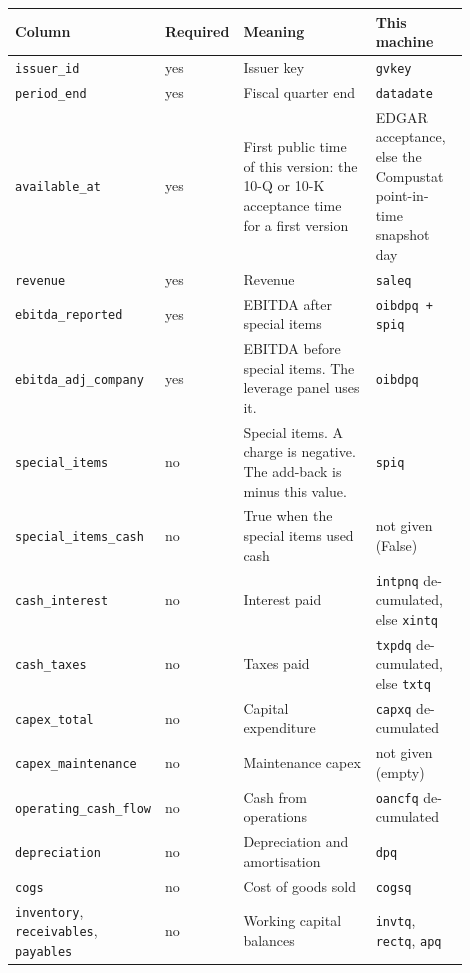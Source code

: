 \documentclass[10.5pt,a4paper]{article}
\newcommand{\code}[1]{\texttt{\small #1}}
\begin{document}
\begin{longtable}{@{}>{\raggedright\arraybackslash}p{0.180\linewidth}>{\raggedright\arraybackslash}p{0.135\linewidth}>{\raggedright\arraybackslash}p{0.360\linewidth}>{\raggedright\arraybackslash}p{0.225\linewidth}@{}}
\toprule
\textbf{Column} & \textbf{Required} & \textbf{Meaning} & \textbf{This machine}\\
\midrule
\endhead
\code{issuer\_\allowbreak{}id} & yes & Issuer key & \code{gvkey}\\
\code{period\_\allowbreak{}end} & yes & Fiscal quarter end & \code{datadate}\\
\code{available\_\allowbreak{}at} & yes & First public time of this version: the 10-Q or 10-K acceptance time for a first version & EDGAR acceptance, else the Compustat point-in-time snapshot day\\
\code{revenue} & yes & Revenue & \code{saleq}\\
\code{ebitda\_\allowbreak{}reported} & yes & EBITDA after special items & \code{oibdpq + spiq}\\
\code{ebitda\_\allowbreak{}adj\_\allowbreak{}company} & yes & EBITDA before special items. The leverage panel uses it. & \code{oibdpq}\\
\code{special\_\allowbreak{}items} & no & Special items. A charge is negative. The add-back is minus this value. & \code{spiq}\\
\code{special\_\allowbreak{}items\_\allowbreak{}cash} & no & True when the special items used cash & not given (False)\\
\code{cash\_\allowbreak{}interest} & no & Interest paid & \code{intpnq} de-cumulated, else \code{xintq}\\
\code{cash\_\allowbreak{}taxes} & no & Taxes paid & \code{txpdq} de-cumulated, else \code{txtq}\\
\code{capex\_\allowbreak{}total} & no & Capital expenditure & \code{capxq} de-cumulated\\
\code{capex\_\allowbreak{}maintenance} & no & Maintenance capex & not given (empty)\\
\code{operating\_\allowbreak{}cash\_\allowbreak{}flow} & no & Cash from operations & \code{oancfq} de-cumulated\\
\code{depreciation} & no & Depreciation and amortisation & \code{dpq}\\
\code{cogs} & no & Cost of goods sold & \code{cogsq}\\
\code{inventory}, \code{receivables}, \code{payables} & no & Working capital balances & \code{invtq}, \code{rectq}, \code{apq}\\

\end{longtable}
\end{document}
